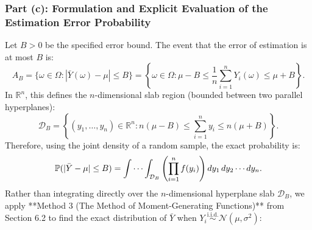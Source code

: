 \documentclass[11pt, letterpaper]{article}
\theoremstyle{definition}
\theoremstyle{remark}
\newcommand{\R}{\mathbb{R}}
\newcommand{\Prob}{\mathbb{P}}
\begin{document}
\subsubsection*{Part (c): Formulation and Explicit Evaluation of the Estimation Error Probability}
Let $B > 0$ be the specified error bound. The event that the error of estimation is at most $B$ is:
\[
    A_B = \{\omega \in \Omega : |\bar{Y}(\omega) - \mu| \le B\} = \left\{\omega \in \Omega : \mu - B \le \frac{1}{n}\sum_{i=1}^n Y_i(\omega) \le \mu + B\right\}.
\]
In $\R^n$, this defines the $n$-dimensional slab region (bounded between two parallel hyperplanes):
\[
    \mathcal{D}_B = \left\{(y_1, \dots, y_n) \in \R^n : n(\mu - B) \le \sum_{i=1}^n y_i \le n(\mu + B)\right\}.
\]
Therefore, using the joint density of a random sample, the exact probability is:
\[
    \Prob(|\bar{Y} - \mu| \le B) = \idotsint_{\mathcal{D}_B} \left(\prod_{i=1}^n f(y_i)\right) dy_1 \, dy_2 \cdots dy_n.
\]
Rather than integrating directly over the $n$-dimensional hyperplane slab $\mathcal{D}_B$, we apply **Method 3 (The Method of Moment-Generating Functions)** from Section 6.2 to find the exact distribution of $\bar{Y}$ when $Y_i \stackrel{\text{i.i.d.}}{\sim} \mathcal{N}(\mu, \sigma^2)$:
\end{document}
